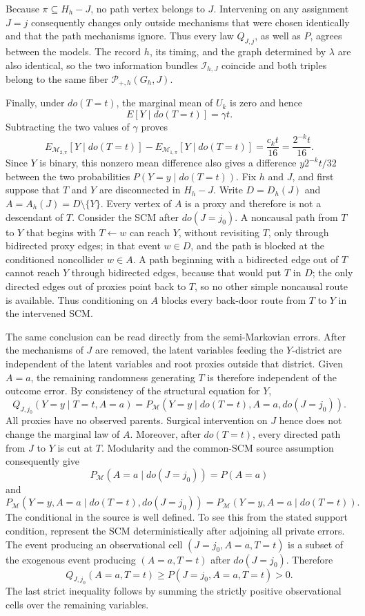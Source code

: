 Because \(\pi\subseteq H_h-J\), no path vertex belongs to \(J\).  Intervening on any assignment \(J=j\) consequently changes only outside mechanisms that were chosen identically and that the path mechanisms ignore.  Thus every law \(Q_{J,j}\), as well as \(P\), agrees between the models.  The record \(h\), its timing, and the graph determined by \(\lambda\) are also identical, so the two information bundles \(\mathcal I_{h,J}\) coincide and both triples belong to the same fiber \(\mathcal P_{+,h}(G_h,J)\).

Finally, under \(do(T=t)\), the marginal mean of \(U_k\) is zero and hence
\[
 E[Y\mid do(T=t)]=\gamma t.
\]
Subtracting the two values of \(\gamma\) proves
\[
 E_{\mathcal M_{2,\pi}}[Y\mid do(T=t)]-
 E_{\mathcal M_{1,\pi}}[Y\mid do(T=t)]
 =\frac{c_kt}{16}=\frac{2^{-k}t}{16}.
\]
Since \(Y\) is binary, this nonzero mean difference also gives a difference \(y2^{-k}t/32\) between the two probabilities \(P(Y=y\mid do(T=t))\).
Fix \(h\) and \(J\), and first suppose that \(T\) and \(Y\) are disconnected in \(H_h-J\).  Write \(D=D_h(J)\) and \(A=A_h(J)=D\setminus\{Y\}\).  Every vertex of \(A\) is a proxy and therefore is not a descendant of \(T\).  Consider the SCM after \(do(J=j_0)\).  A noncausal path from \(T\) to \(Y\) that begins with \(T\leftarrow w\) can reach \(Y\), without revisiting \(T\), only through bidirected proxy edges; in that event \(w\in D\), and the path is blocked at the conditioned noncollider \(w\in A\).  A path beginning with a bidirected edge out of \(T\) cannot reach \(Y\) through bidirected edges, because that would put \(T\) in \(D\); the only directed edges out of proxies point back to \(T\), so no other simple noncausal route is available.  Thus conditioning on \(A\) blocks every back-door route from \(T\) to \(Y\) in the intervened SCM.

The same conclusion can be read directly from the semi-Markovian errors.  After the mechanisms of \(J\) are removed, the latent variables feeding the \(Y\)-district are independent of the latent variables and root proxies outside that district.  Given \(A=a\), the remaining randomness generating \(T\) is therefore independent of the outcome error.  By consistency of the structural equation for \(Y\),
\[
 Q_{J,j_0}(Y=y\mid T=t,A=a)
 =P_{\mathcal M}(Y=y\mid do(T=t),A=a,do(J=j_0)).
\]
All proxies have no observed parents.  Surgical intervention on \(J\) hence does not change the marginal law of \(A\).  Moreover, after \(do(T=t)\), every directed path from \(J\) to \(Y\) is cut at \(T\).  Modularity and the common-SCM source assumption consequently give
\[
 P_{\mathcal M}(A=a\mid do(J=j_0))=P(A=a)
\]
and
\[
 P_{\mathcal M}(Y=y,A=a\mid do(T=t),do(J=j_0))
 =P_{\mathcal M}(Y=y,A=a\mid do(T=t)).
\]
The conditional in the source is well defined.  To see this from the stated support condition, represent the SCM deterministically after adjoining all private errors.  The event producing an observational cell \((J=j_0,A=a,T=t)\) is a subset of the exogenous event producing \((A=a,T=t)\) after \(do(J=j_0)\).  Therefore
\[
 Q_{J,j_0}(A=a,T=t)\ge P(J=j_0,A=a,T=t)>0.
\]
The last strict inequality follows by summing the strictly positive observational cells over the remaining variables.

